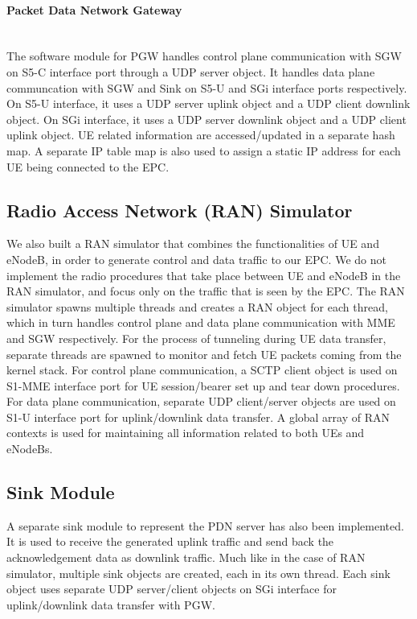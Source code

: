 \documentclass[hidelinks]{report}
\begin{document}
\paragraph*{Packet Data Network Gateway}

~\\ The software module for PGW handles control plane communication with SGW on S5-C interface port through a UDP server object. It handles data plane communcation with SGW and Sink on S5-U and SGi interface ports respectively. On S5-U interface, it uses a UDP server uplink object and a UDP client downlink object. On SGi interface, it uses a UDP server downlink object and a UDP client uplink object. UE related information are accessed/updated in a separate hash map. A separate IP table map is also used to assign a static IP address for each UE being connected to the EPC.

\subsection*{Radio Access Network (RAN) Simulator}

We also built a RAN simulator that combines the functionalities of UE and eNodeB, in order to generate control and data traffic to our EPC. We do not implement the radio procedures that take place between UE and eNodeB in the RAN simulator, and focus only on the traffic that is seen by the EPC. The RAN simulator spawns multiple threads and creates a RAN object for each thread, which in turn handles control plane and data plane communication with MME and SGW respectively. For the process of tunneling during UE data transfer, separate threads are spawned to monitor and fetch UE packets coming from the kernel stack.  For control plane communication, a SCTP client object is used on S1-MME interface port for UE session/bearer set up and tear down procedures. For data plane communication, separate UDP client/server objects are used on S1-U interface port for uplink/downlink data transfer. A global array of RAN contexts is used for  maintaining all information related to both UEs and eNodeBs.

\subsection*{Sink Module}

A separate sink module to represent the PDN server has also been implemented. It is used to receive the generated uplink traffic and send back the acknowledgement data as downlink traffic.  Much like in the case of RAN simulator, multiple sink objects are created, each in its own thread. Each sink object uses separate UDP server/client objects on SGi interface for uplink/downlink data transfer with PGW.
\end{document}
